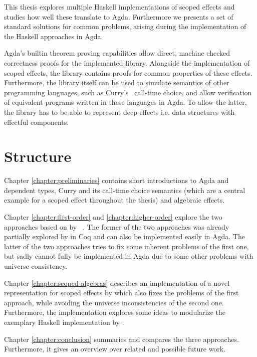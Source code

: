 \documentclass[10pt,a4paper,twoside]{report}
\begin{document}
This thesis explores multiple Haskell implementations of scoped effects and
studies how well these translate to Agda.
Furthermore we presents a set of standard solutions for common problems, arising
during the implementation of the Haskell approaches in Agda.

Agda's builtin theorem proving capabilities allow direct, machine checked
correctness proofs for the implemented library.
Alongside the implementation of scoped effects, the library contains proofs for
common properties of these effects.
Furthermore, the library itself can be used to simulate semantics of other
programming languages, such as Curry's~\cite{Hanus95curry} call-time choice, and
allow verification of equivalent programs written in these languages in Agda.
To allow the latter, the library has to be able to represent deep effects i.e.
data structures with effectful components.


\section{Structure}

Chapter \ref{chapter:preliminaries} contains short introductions to Agda and
dependent types, Curry and its call-time choice semantics (which are a central
example for a scoped effect throughout the thesis) and algebraic effects.

Chapter \ref{chapter:first-order} and \ref{chapter:higher-order} explore the two
approaches based on  by
~\textcite{DBLP:conf/haskell/WuSH14}.
The former of the two approaches was already partially explored by
\textcite{bunkenburg2019modeling} in Coq and can also be implemented
easily in Agda.
The latter of the two approaches tries to fix some inherent problems of the
first one, but sadly cannot fully be implemented in Agda due to some other
problems with universe consistency.

Chapter \ref{chapter:scoped-algebras} describes an implementation of a novel
representation for scoped effects by \textcite{DBLP:conf/lics/PirogSWJ18} which
also fixes the problems of the first approach, while avoiding the universe
inconsistencies of the second one.
Furthermore, the implementation explores some ideas to modularize the exemplary
Haskell implementation by \citeauthor{DBLP:conf/lics/PirogSWJ18}.

Chapter \ref{chapter:conclusion} summaries and compares the three approaches.
Furthermore, it gives an overview over related and possible future work.
\end{document}
